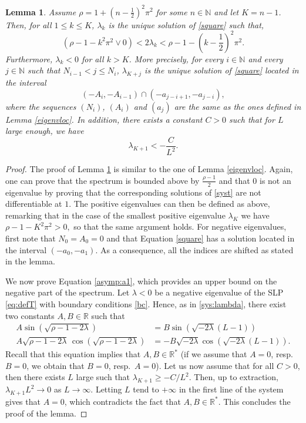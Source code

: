 \documentclass[11pt]{article}
\theoremstyle{plain}
\newtheorem{lemma}{Lemma}[section]
\begin{document}
\begin{lemma}\label{ev:sc}
Assume $\rho=1+\left(n-\frac{1}{2}\right)^2\pi^2$ for some $n\in\mathbb{N}$ and let $K=n-1$. Then, for all $1\leqslant k \leqslant K$, $\lambda_k$ is the unique solution of \eqref{square}
such that,
\begin{equation*}
    (\rho-1-k^2\pi^2\vee 0)<2\lambda_{k}< \rho - 1-\left(k-\frac{1}{2}\right)^2\pi^2. 
\end{equation*}
Furthermore, $\lambda_k<0$ for all $k > K$. More precisely, for every $i\in\mathbb{N}$ and every $j\in \mathbb{N}$ such that $N_{i-1} < j \le N_{i}$,
$\lambda_{K+j}$ is the unique solution of  \eqref{square} located  in the interval
\begin{equation}
(-A_{i},-A_{i-1}) \cap (-a_{j-i+1},-a_{j-i}), \label{eigenvlocsc}
\end{equation}
where the sequences $(N_i)$, $(A_i)$ and $(a_j)$ are the same as the ones defined in Lemma \ref{eigenvloc}.
In addition, there exists a constant $C>0$ such that for $L$ large enough, we have 
\begin{equation}
\lambda_{K+1}<-\frac{C}{L^2}. \label{asymp:a1}
\end{equation}
\end{lemma}
\begin{proof}
The proof of Lemma \ref{ev:sc} is similar to the one of Lemma \ref{eigenvloc}. Again, one can prove that the spectrum is bounded above by $\frac{\rho-1}{2}$ and that $0$ is not an eigenvalue by proving that the corresponding solutions of \eqref{syst} are not differentiable at $1$.
The positive eigenvalues can then be defined as above, remarking that in the case of the smallest positive eigenvalue $\lambda_K$ we have $\rho-1-K^2\pi^2>0,
$ so that the same argument holds.
For negative eigenvalues, first note that $N_0=A_0=0$ and that Equation \eqref{square} has a solution located in the interval $(-a_0,-a_1)$. As a consequence, all the indices are shifted as stated in the lemma.
 
We now prove Equation \eqref{asymp:a1}, which provides an upper bound on the negative part of the spectrum. Let $\lambda<0$ be a negative  eigenvalue of the SLP \eqref{eq:defT} with boundary conditions \eqref{bc}. Hence, as in \eqref{sys:lambda}, there exist two constants $A,B\in\mathbb{R}$ such that 
\begin{align*}
A\sin(\sqrt{\rho-1-2\lambda} ) & =B\sin(\sqrt{-2\lambda}(L-1))\\
A\sqrt{\rho-1-2\lambda}\, \cos(\sqrt{\rho-1-2\lambda}) & = -B\sqrt{-2\lambda} \cos(\sqrt{-2\lambda}(L-1)).
\end{align*}
Recall that this equation implies that $A,B\in\mathbb{R}^*$ (if we assume that $A=0$, resp.~$B=0$, we obtain that $B=0$, resp.~$A=0$). Let us now assume that for all $C>0$, then there exists $L$ large  such that $\lambda_{K+1}\geqslant -C/L^2$. Then, up to extraction, $\lambda_{K+1}L^2\to0$ as $L\to \infty$. Letting $L$ tend to $+\infty$ in the first line of the system gives that $A=0$, which contradicts the fact that $A,B\in\mathbb{R}^*$. This concludes the proof of the lemma. 
\end{proof}
\end{document}
